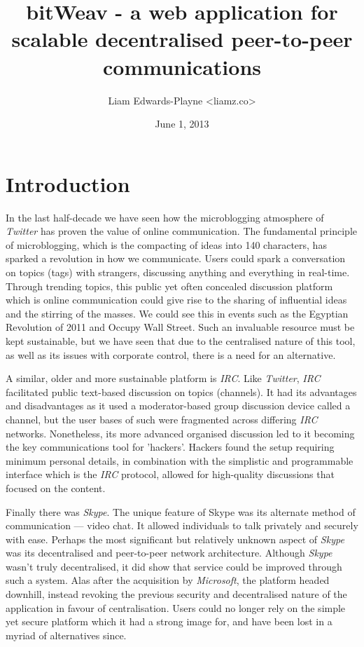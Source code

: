\documentclass[10pt,a4paper,onecolumn]{article}
\author{Liam Edwards-Playne \textless liamz.co\textgreater}
\date{June 1, 2013}
\title{bitWeav - a web application for scalable decentralised peer-to-peer  communications}
\begin{document}
\maketitle
\begin{abstract}
\end{abstract}

\section{Introduction}
\label{intro}
In the last half-decade we have seen how the microblogging atmosphere of \emph{Twitter} has proven the value of online communication. The fundamental principle of microblogging, which is the compacting of ideas into 140 characters, has sparked a revolution in how we communicate. Users could spark a conversation on topics (tags) with strangers, discussing anything and everything in real-time. Through trending topics, this public yet often concealed discussion platform which is online communication could give rise to the sharing of influential ideas and the stirring of the masses. We could see this in events such as the Egyptian Revolution of 2011 and Occupy Wall Street. Such an invaluable resource must be kept sustainable, but we have seen that due to the centralised nature of this tool, as well as its issues with corporate control, there is a need for an alternative. 

A similar, older and more sustainable platform is \emph{IRC}. Like \emph{Twitter}, \emph{IRC} facilitated public text-based discussion on topics (channels). It had its advantages and disadvantages as it used a moderator-based group discussion device called a channel, but the user bases of such were fragmented across differing \emph{IRC} networks. Nonetheless, its more advanced organised discussion led to it becoming the key communications tool for 'hackers'. Hackers found the setup requiring minimum personal details, in combination with the simplistic and programmable interface which is the \emph{IRC} protocol, allowed for high-quality discussions that focused on the content. 

Finally there was \emph{Skype}. The unique feature of Skype was its alternate method of communication — video chat. It allowed individuals to talk privately and securely with ease. Perhaps the most significant but relatively unknown aspect of \emph{Skype} was its decentralised and peer-to-peer network architecture. Although \emph{Skype} wasn't truly decentralised, it did show that service could be improved through such a system. Alas after the acquisition by \textit{Microsoft}, the platform headed downhill, instead revoking the previous security and decentralised nature of the application in favour of centralisation. Users could no longer rely on the simple yet secure platform which it had a strong image for, and have been lost in a myriad of alternatives since. 
\end{document}

